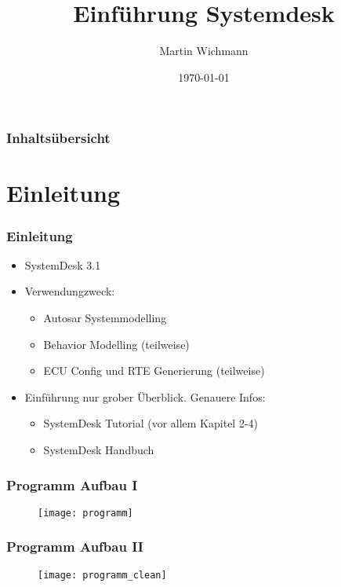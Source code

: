 \documentclass[]{beamer}
\author{Martin Wichmann}
\title{Einführung Systemdesk}
\date{\today}
\institute{Ostfalia Hochschule für angewandte Wissenschaften}
\begin{document}
\begin{frame}
\maketitle
\end{frame}


\begin{frame}
\frametitle{Inhaltsübersicht}
\tableofcontents
\end{frame}





\section{Einleitung}
\label{sec:einleitung}

\begin{frame}
\frametitle{Einleitung}
    \begin{itemize}
    \item SystemDesk 3.1
    \item Verwendungzweck:
        \begin{itemize}
        \item Autosar Systemmodelling
        \item Behavior Modelling (teilweise)
        \item ECU Config und RTE Generierung (teilweise)
        \end{itemize}
    \item Einführung nur grober Überblick. Genauere Infos:
        \begin{itemize}
        \item SystemDesk Tutorial (vor allem Kapitel 2-4)
        \item SystemDesk Handbuch
        \end{itemize}
    \end{itemize}
\end{frame}


\begin{frame}
\frametitle{Programm Aufbau I}
    \begin{figure}
       \texttt{[image: programm]}
    \end{figure}
\end{frame}

\begin{frame}
\frametitle{Programm Aufbau II}
    \begin{figure}
       \texttt{[image: programm\_clean]}
    \end{figure}
\end{frame}
\end{document}
